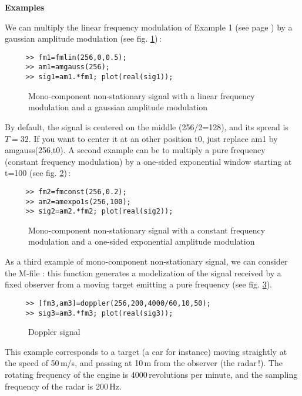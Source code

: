  {\bf Examples}  

We can multiply the linear frequency modulation of Example 1 (see page
\pageref{ex1}) by a gaussian amplitude modulation (see
fig. \ref{Ns6fig1})\,:
\begin{verbatim}
     >> fm1=fmlin(256,0,0.5);
     >> am1=amgauss(256);
     >> sig1=am1.*fm1; plot(real(sig1));
\end{verbatim}
\begin{figure}[htb]
\epsfxsize=10cm
\epsfysize=6cm
\centerline{}
\caption{\label{Ns6fig1}Mono-component non-stationary signal with a linear
frequency modulation and a gaussian amplitude modulation}
\end{figure}
By default, the signal is centered on the middle (256/2=128), and its
spread is $T=32$. If you want to center it at an other position {\ttfamily
t0}, just replace {\ttfamily am1} by {\ttfamily amgauss(256,t0)}. A second
example can be to multiply a pure frequency (constant frequency modulation)
by a one-sided exponential window starting at {\ttfamily t=100} (see
fig. \ref{Ns6fig2})\,:
\begin{verbatim}
     >> fm2=fmconst(256,0.2);
     >> am2=amexpo1s(256,100);
     >> sig2=am2.*fm2; plot(real(sig2));
\end{verbatim}
\begin{figure}[htb]
\epsfxsize=10cm
\epsfysize=6cm
\centerline{}
\caption{\label{Ns6fig2}Mono-component non-stationary signal with a
constant frequency modulation and a one-sided exponential amplitude
modulation} 
\end{figure}

As a third example of mono-component non-stationary signal, we can consider
the M-file  : this function
generates a modelization of the signal received by a fixed observer from a
moving target emitting a pure frequency (see fig. \ref{Ns6fig3}).
\begin{verbatim}
     >> [fm3,am3]=doppler(256,200,4000/60,10,50);
     >> sig3=am3.*fm3; plot(real(sig3));
\end{verbatim}
\begin{figure}[htb]
\epsfxsize=10cm
\epsfysize=6cm
\centerline{}
\caption{\label{Ns6fig3}Doppler signal}
\end{figure}
This example corresponds to a target (a car for instance) moving straightly
at the speed of 50\,m/s, and passing at 10\,m from the observer (the
radar\,!). The rotating frequency of the engine is 4000\,revolutions per
minute, and the sampling frequency of the radar is 200\,Hz.\\

